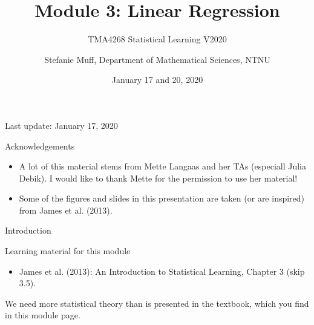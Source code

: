 \documentclass[10pt,ignorenonframetext,]{beamer}
\title{Module 3: Linear Regression}
\subtitle{TMA4268 Statistical Learning V2020}
\author{Stefanie Muff, Department of Mathematical Sciences, NTNU}
\date{January 17 and 20, 2020}
\providecommand{\tightlist}{%
  \setlength{\itemsep}{0pt}\setlength{\parskip}{0pt}}
\begin{document}
\frame{\titlepage}

\begin{frame}

Last update: January 17, 2020

\end{frame}

\begin{frame}{Acknowledgements}

\begin{itemize}
\item
  A lot of this material stems from Mette Langaas and her TAs (especiall
  Julia Debik). I would like to thank Mette for the permission to use
  her material!
\item
  Some of the figures and slides in this presentation are taken (or are
  inspired) from James et al. (2013).
\end{itemize}

\end{frame}

\begin{frame}{Introduction}

\begin{block}{Learning material for this module}

\begin{itemize}
\tightlist
\item
  James et al. (2013): An Introduction to Statistical Learning, Chapter
  3 (skip 3.5).
\end{itemize}

We need more statistical theory than is presented in the textbook, which
you find in this module page.

\end{block}

\end{frame}
\end{document}
